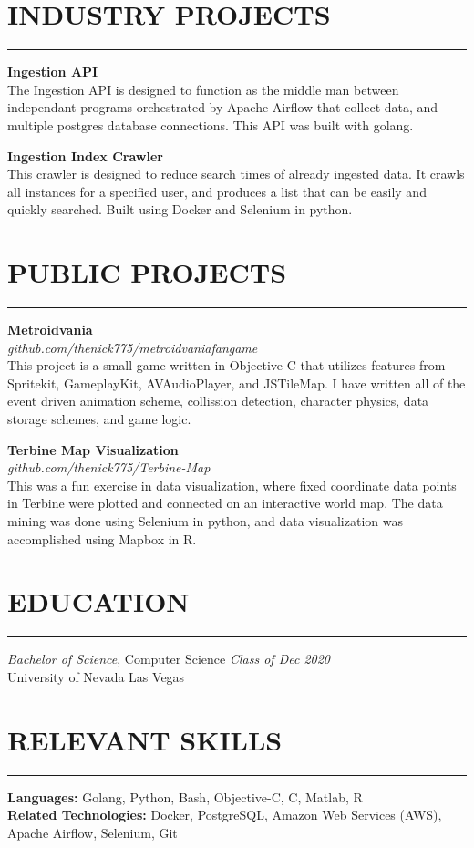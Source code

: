 \documentclass{res}
\begin{document}
\begin{resume}
		\section{{INDUSTRY PROJECTS}}
    \noindent\rule[0.5ex]{\linewidth}{1pt}
		{\bf Ingestion API} \hfill \vspace{3pt} \\
			The Ingestion API is designed to function as the middle man between independant programs orchestrated by Apache Airflow that collect data, and multiple postgres database connections. This API was built with golang.

		{\bf Ingestion Index Crawler} \hfill \vspace{3pt}\\
			This crawler is designed to reduce search times of already ingested data. It crawls all instances for a specified user, and produces a list that can be easily and quickly searched. Built using Docker and Selenium in python.

		\section{{PUBLIC PROJECTS}}
    \noindent\rule[0.5ex]{\linewidth}{1pt}
		{\bf Metroidvania} \\
			\emph{github.com/thenick775/metroidvaniafangame} \hfill \vspace{3pt}\\
			This project is a small game written in Objective-C that utilizes features from Spritekit, GameplayKit, AVAudioPlayer, and JSTileMap. I have written all of the event driven animation scheme, collission detection, character physics, data storage schemes, and game logic.

		{\bf Terbine Map Visualization} \\
			\emph{github.com/thenick775/Terbine-Map} \hfill \vspace{3pt} \\
			This was a fun exercise in data visualization, where fixed coordinate data points in Terbine were plotted and connected on an interactive world map. The data mining was done using Selenium in python, and data visualization was accomplished using Mapbox in R.


		\section{{EDUCATION}}
    \noindent\rule[0.5ex]{\linewidth}{1pt}
		{\sl Bachelor of Science}, Computer Science \hfill \emph{Class of Dec 2020} \\
		University of Nevada Las Vegas


		\section{{RELEVANT SKILLS}}
    \noindent\rule[0.5ex]{\linewidth}{1pt}
			{\bf Languages:} Golang, Python, Bash, Objective-C, C, Matlab, R \\
			{\bf Related Technologies:} Docker, PostgreSQL, Amazon Web Services (AWS), Apache Airflow, Selenium, Git

	\end{resume}
\end{document}
